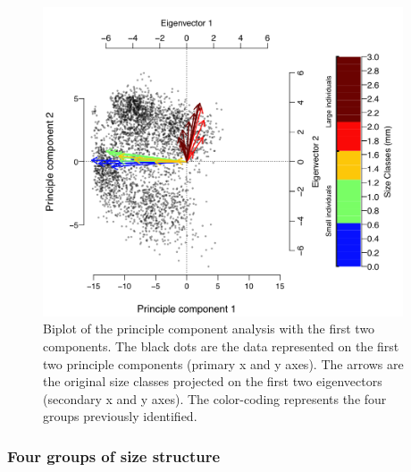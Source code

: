 \begin{figure}[!ht]
\begin{center}
\includegraphics[width=0.95\textwidth]{3-1_ChapExp1/Fig/AnnSP4}
\caption[Biplot of the principle component
analysis]{Biplot of the principle component analysis with the first two
components. The black dots are the data represented on the first two principle
components (primary x and y axes). The arrows are the original
size classes projected on the first two eigenvectors (secondary x and y axes).
The color-coding represents the four groups previously identified.}
\label{fig:AnSP4}
\end{center}
\end{figure}

\subsubsection{Four groups of size structure}

